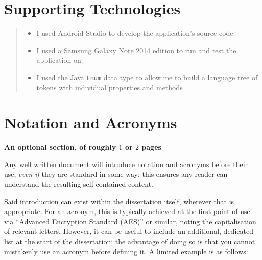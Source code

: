 \documentclass[ %
                    author={Jonathan Rankin},
                supervisor={Dr. David May, Dr. Ian Holyer},
                    degree={MEng},
                     title={CodeTouch},
                  subtitle={A Revolutionary Way To Program Real Code On Touch Screen Devices},
                      type={enterprise},
                      year={2015 } ]{dissertation}
\begin{document}


\chapter*{Supporting Technologies}


\vspace{1cm} 


\begin{quote}
\begin{itemize}
\item I used Android Studio \cite{AndroidStudio} to develop the application's source code
\item I used a Samsung Galaxy Note 2014 edition to run and test the application on \cite{GalaxyNote}
\item I used the Java {\tt Enum} data type to allow me to build a language tree of tokens with individual properties and methods
\end{itemize}
\end{quote}


\chapter*{Notation and Acronyms}

{\bf An optional section, of roughly $1$ or $2$ pages}
\vspace{1cm} 

\noindent
Any well written document will introduce notation and acronyms before
their use, {\em even if} they are standard in some way: this ensures 
any reader can understand the resulting self-contained content.  

Said introduction can exist within the dissertation itself, wherever 
that is appropriate.  For an acronym, this is typically achieved at 
the first point of use via ``Advanced Encryption Standard (AES)'' or 
similar, noting the capitalisation of relevant letters.  However, it 
can be useful to include an additional, dedicated list at the start 
of the dissertation; the advantage of doing so is that you cannot 
mistakenly use an acronym before defining it.  A limited example is 
as follows:
\end{document}
